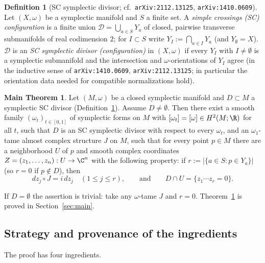 \documentclass[11pt]{amsart}
\theoremstyle{plain}
\theoremstyle{definition}
\newtheorem{definition}[theorem]{Definition}
\newtheorem*{mainthm}{Main Theorem}
\newcommand{\DD}{\mathcal{D}}
\begin{document}
\begin{definition}[{SC symplectic divisor; cf.\ \texttt{arXiv:2112.13125},
\texttt{arXiv:1410.0609}}]\label{def:sc}
Let $(X,\omega)$ be a symplectic manifold and $S$ a finite set. A
\emph{simple crossings (SC) configuration} is a finite union
$\DD=\bigcup_{a\in S}Y_a$ of closed, pairwise transverse submanifolds of real
codimension $2$; for $I\subset S$ write $Y_I:=\bigcap_{a\in I}Y_a$ (and
$Y_\emptyset=X$). $\DD$ is an \emph{SC symplectic divisor (configuration)} in
$(X,\omega)$ if every $Y_I$ with $I\neq\emptyset$ is a symplectic submanifold
and the intersection and $\omega$-orientations of $Y_I$ agree (in the
inductive sense of \texttt{arXiv:1410.0609}, \texttt{arXiv:2112.13125}; in
particular the orientation data needed for compatible normalizations hold).
\end{definition}

\begin{mainthm}\label{thm:main}
Let $(M,\omega)$ be a closed symplectic manifold and $D\subset M$ a symplectic
SC divisor (Definition~\ref{def:sc}). Assume $D\neq\emptyset$. Then there
exist a smooth family $(\omega_t)_{t\in[0,1]}$ of symplectic forms on $M$ with
$[\omega_t]=[\omega]\in H^2(M;\R)$ for all $t$, such that $D$ is an SC
symplectic divisor with respect to every $\omega_t$, and an
$\omega_1$-tame almost complex structure $J$ on $M$, such that for every
point $p\in M$ there are a neighborhood $U$ of $p$ and smooth complex
coordinates $Z=(z_1,\dots,z_n):U\to\C^n$ with the following property: if
$r:=|\{a\in S: p\in Y_a\}|$ (so $r=0$ if $p\notin D$), then
\[
 dz_j\circ J=i\,dz_j\quad (1\le j\le r),
 \qquad\text{and}\qquad
 D\cap U=\{z_1\cdots z_r=0\}.
\]
\end{mainthm}

If $D=\emptyset$ the assertion is trivial: take any $\omega$-tame $J$ and
$r=0$. Theorem~\ref{thm:main} is proved in Section~\ref{sec:main}.

\subsection{Strategy and provenance of the ingredients}

The proof has four ingredients.
\end{document}
